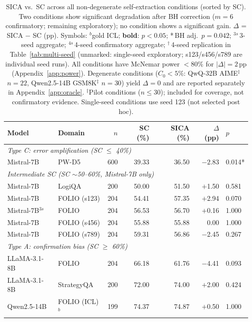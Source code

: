 \begin{table}[t]
\centering
\small
\caption{SICA vs.\ SC across all non-degenerate self-extraction conditions (sorted by SC). Two conditions show significant degradation after BH correction ($m{=}6$ confirmatory; remaining exploratory); no condition shows a significant gain. $\Delta$ = SICA $-$ SC (pp). Symbols: $^b$gold ICL; \textbf{bold}: $p < 0.05$; {*}\,BH adj.\ $p = 0.042$; $^{3s}$\,3-seed aggregate; $^{4s}$\,4-seed confirmatory aggregate; $^\dagger$\,4-seed replication in Table~\ref{tab:multi-seed} (unmarked: single-seed exploratory; s123/s456/s789 are individual seed runs). All conditions have McNemar power $< 80\%$ for $|\Delta| = 2$\,pp (Appendix~\ref{app:power}). Degenerate conditions ($C_0 < 5\%$: QwQ-32B AIME$^\ddagger$ $n{=}22$, Qwen2.5-14B GSM8K$^\ddagger$ $n{=}30$) yield $\Delta = 0$ and are reported separately in Appendix~\ref{app:oracle}. $^\ddagger$Pilot conditions ($n{\leq}30$); included for coverage, not confirmatory evidence. Single-seed conditions use seed 123 (not selected post hoc).}
\label{tab:main_results}
\begin{tabular}{@{}llrrrrl@{}}
\toprule
Model & Domain & $n$ & SC (\%) & SICA (\%) & $\Delta$ (pp) & $p$ \\
\midrule
\multicolumn{7}{l}{\textit{Type C: error amplification (SC $\leq$ 40\%)}} \\
Mistral-7B & PW-D5 & 600 & 39.33 & 36.50 & $\mathbf{-2.83}$ & 0.014{*} \\
\midrule
\multicolumn{7}{l}{\textit{Intermediate SC (SC $\sim$50--60\%, Mistral-7B only)}} \\
Mistral-7B & LogiQA & 200 & 50.00 & 51.50 & $+$1.50 & 0.581 \\
Mistral-7B & FOLIO (s123) & 204 & 54.41 & 57.35 & $+$2.94 & 0.070 \\
Mistral-7B$^{3s}$ & FOLIO & 204 & 56.53 & 56.70 & $+$0.16 & 1.000 \\
Mistral-7B & FOLIO (s456) & 204 & 55.88 & 55.88 & 0.00 & 1.000 \\
Mistral-7B & FOLIO (s789) & 204 & 59.31 & 56.86 & $-$2.45 & 0.267 \\
\midrule
\multicolumn{7}{l}{\textit{Type A: confirmation bias (SC $\geq$ 60\%)}} \\
LLaMA-3.1-8B & FOLIO & 204 & 66.18 & 61.76 & $-$4.41 & 0.093 \\
LLaMA-3.1-8B & StrategyQA & 200 & 72.00 & 74.00 & $+$2.00 & 0.424 \\
\addlinespace
Qwen2.5-14B & FOLIO (ICL)$^b$ & 199 & 74.37 & 74.87 & $+$0.50 & 1.000 \\

\end{tabular}
\end{table}
